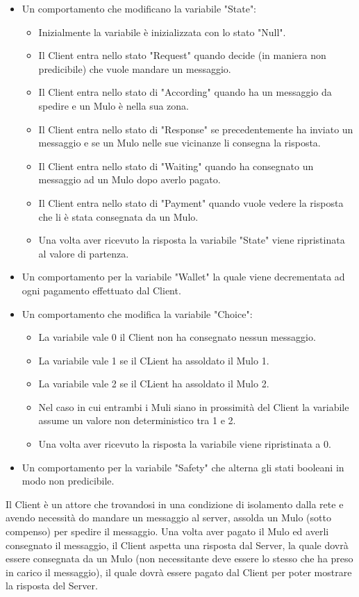 \documentclass[13pt,a4paper]{article}
\begin{document}
\begin{itemize}
\begin{itemize}
		\item Un comportamento che modificano la variabile "State":
		\begin{itemize}
			\item Inizialmente la variabile è inizializzata con lo stato "Null".
			\item Il Client entra nello stato "Request" quando decide (in maniera non predicibile) che vuole mandare un messaggio.
			\item Il Client entra nello stato di "According" quando ha un messaggio da spedire e un Mulo è nella sua zona.
			\item Il Client entra nello stato di "Response" se precedentemente ha inviato un messaggio e se un Mulo nelle sue vicinanze li consegna la risposta.
			\item Il Client entra nello stato di "Waiting" quando ha consegnato un messaggio ad un Mulo dopo averlo pagato. 
			\item Il Client entra nello stato di "Payment" quando vuole vedere la risposta che li è stata consegnata da un Mulo.
			\item Una volta aver ricevuto la risposta la variabile "State" viene ripristinata al valore di partenza.
		\end{itemize}
		\item Un comportamento per la variabile "Wallet" la quale viene decrementata ad ogni pagamento effettuato dal Client.
		\item Un comportamento che modifica la variabile "Choice":
		\begin{itemize}
			\item La variabile vale 0 il Client non ha consegnato nessun messaggio.
			\item La variabile vale 1 se  il CLient ha assoldato il Mulo 1.
			\item La variabile vale 2 se  il CLient ha assoldato il Mulo 2.
			\item Nel caso in cui entrambi i Muli siano in prossimità del Client la variabile assume un valore non deterministico tra 1 e 2.
			\item Una volta aver ricevuto la risposta la variabile viene ripristinata a 0.
		\end{itemize}
	\item Un comportamento per la variabile "Safety" che alterna gli stati booleani in modo non predicibile.
	\end{itemize}
	Il Client  è un attore che trovandosi in una condizione di isolamento dalla rete e avendo necessità do mandare un messaggio al server, assolda un Mulo (sotto compenso) per spedire il messaggio. Una volta aver pagato il Mulo ed averli consegnato il messaggio, il Client aspetta una risposta dal Server, la quale dovrà essere consegnata da un Mulo (non necessitante deve essere lo stesso che ha preso in carico il messaggio), il quale dovrà essere pagato dal Client per poter mostrare la risposta del Server.
	

\end{itemize}
\end{document}
